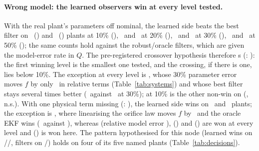 \paragraph{Wrong model: the learned observers win at every level tested.} With the real plant's parameters off nominal, the learned side beats the best filter on \CthreeMismatchTenIdVsWorking\ () and \CthreeMismatchTenSeqVsWorking\ () plants at 10\% (\OutcomeCThreeMismatchTen), \CthreeMismatchTwentyIdVsWorking\ and \CthreeMismatchTwentySeqVsWorking\ at 20\% (\OutcomeCThreeMismatchTwenty), \CthreeMismatchThirtyIdVsWorking\ and \CthreeMismatchThirtySeqVsWorking\ at 30\% (\OutcomeCThreeMismatchThirty), \CthreeMismatchFiftyIdVsWorking\ and \CthreeMismatchFiftySeqVsWorking\ at 50\% (\OutcomeCThreeMismatchFifty); the same counts hold against the robust/oracle filters, which are given the model-error rate in $Q$. The pre-registered crossover hypothesis therefore \FAIL s (: \OutcomeCThreeMismatchCrossover): the first winning level is the smallest one tested, and the crossing, if there is one, lies below 10\%. The exception at every level is , whose 30\% parameter error moves $f$ by only \ModelErrDuffingMismatchThirty\ in relative terms (Table~\ref{tab:systems}) and whose best filter stays several times better (\CthreeMismatchThirtySeqDuffingBestWorking\ against \CthreeMismatchThirtySeqDuffingBestLearned\ at 30\%);  at 10\% is the other non-win on  (\CthreeMismatchTenSeqBatteryVsWorking, n.s.). With one physical term missing (: \OutcomeCThreePartial), the learned side wins on \CthreePartialIdVsWorking\ and \CthreePartialSeqVsWorking\ plants; the exception is , where linearising the orifice law moves $f$ by \ModelErrQuadTankPartial\ and the oracle EKF wins (\CthreePartialSeqQuadTankBestWorking\ against \CthreePartialSeqQuadTankBestLearned), whereas  (relative model error \ModelErrBioreactorPartial),  (\ModelErrLorenzPartial) and  (\ModelErrVdpPartial) are won at every level and  (\ModelErrDuffingPartial) is won here. The pattern hypothesised for this node (learned wins on //, filters on /) holds on four of its five named plants (Table~\ref{tab:decisions}).

